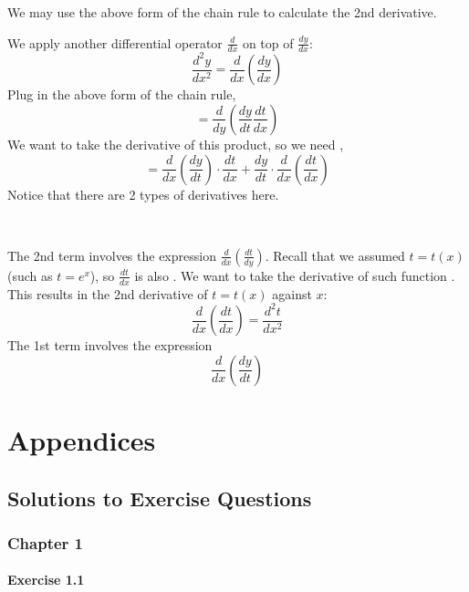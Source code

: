 \documentclass[11pt,fleqn]{book} %
\begin{document}
We may use the above form of the chain rule to calculate the 2nd derivative.

We apply another differential operator $\frac{d}{dx}$ on top of $\frac{dy}{dx}$: $$\frac{d^2y}{dx^2} = \frac{d}{dx} \left( \frac{dy}{dx} \right)$$ Plug in the above form of the chain rule, $$= \frac{d}{dy} \left( \frac{dy}{dt} \frac{dt}{dx} \right)$$ We want to take the derivative of this product, so we need , $$= \frac{d}{dx}\left( \frac{dy}{dt} \right) \cdot \frac{dt}{dx} + \frac{dy}{dt} \cdot \frac{d}{dx} \left( \frac{dt}{dx} \right)$$ Notice that there are 2 types of derivatives here.

{~~~}

The 2nd term involves the expression $\frac{d}{dx} \left( \frac{dt}{dy} \right)$. Recall that we assumed $t = t(x)$ (such as $t = e^x$), so $\frac{dt}{dx}$ is also . We want to take the derivative of such function . This results in the 2nd derivative of $t = t(x)$ against $x$: $$\frac{d}{dx} \left( \frac{dt}{dx} \right) = \frac{d^2t}{dx^2}$$ The 1st term involves the expression $$\frac{d}{dx} \left( \frac{dy}{dt} \right)$$



\part{Appendices}


\chapter*{Solutions to Exercise Questions}
\setlength{\parindent}{0pt} %

\section*{Chapter 1}

\subsection*{Exercise 1.1}
\end{document}
